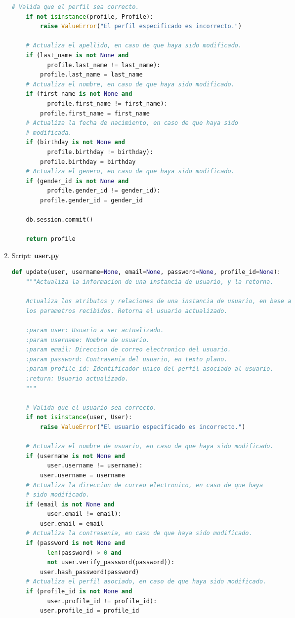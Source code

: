 \begin{enumerate}
\begin{lstlisting}[language=Python]
    # Valida que el perfil sea correcto.
    if not isinstance(profile, Profile):
        raise ValueError("El perfil especificado es incorrecto.")

    # Actualiza el apellido, en caso de que haya sido modificado.
    if (last_name is not None and
          profile.last_name != last_name):
        profile.last_name = last_name
    # Actualiza el nombre, en caso de que haya sido modificado.
    if (first_name is not None and
          profile.first_name != first_name):
        profile.first_name = first_name
    # Actualiza la fecha de nacimiento, en caso de que haya sido
    # modificada.
    if (birthday is not None and
          profile.birthday != birthday):
        profile.birthday = birthday
    # Actualiza el genero, en caso de que haya sido modificado.
    if (gender_id is not None and
          profile.gender_id != gender_id):
        profile.gender_id = gender_id

    db.session.commit()

    return profile
\end{lstlisting}

\item Script: \textbf{user.py}

\begin{lstlisting}[language=Python]
def update(user, username=None, email=None, password=None, profile_id=None):
    """Actualiza la informacion de una instancia de usuario, y la retorna.

    Actualiza los atributos y relaciones de una instancia de usuario, en base a
    los parametros recibidos. Retorna el usuario actualizado.

    :param user: Usuario a ser actualizado.
    :param username: Nombre de usuario.
    :param email: Direccion de correo electronico del usuario.
    :param password: Contrasenia del usuario, en texto plano.
    :param profile_id: Identificador unico del perfil asociado al usuario.
    :return: Usuario actualizado.
    """

    # Valida que el usuario sea correcto.
    if not isinstance(user, User):
        raise ValueError("El usuario especificado es incorrecto.")

    # Actualiza el nombre de usuario, en caso de que haya sido modificado.
    if (username is not None and
          user.username != username):
        user.username = username
    # Actualiza la direccion de correo electronico, en caso de que haya
    # sido modificado.
    if (email is not None and
          user.email != email):
        user.email = email
    # Actualiza la contrasenia, en caso de que haya sido modificado.
    if (password is not None and
          len(password) > 0 and
          not user.verify_password(password)):
        user.hash_password(password)
    # Actualiza el perfil asociado, en caso de que haya sido modificado.
    if (profile_id is not None and
          user.profile_id != profile_id):
        user.profile_id = profile_id


\end{lstlisting}
\end{enumerate}

